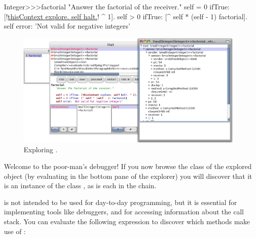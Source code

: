 \documentclass[a4paper,10pt,twoside]{book}
\begin{document}

\begin{code}{}
Integer>>>factorial
        "Answer the factorial of the receiver."
        self = 0 ifTrue: [!\underline{thisContext explore. self halt.}! ^ 1].
        self > 0 ifTrue: [^ self * (self - 1) factorial].
        self error: 'Not valid for negative integers'
\end{code}


\begin{figure}[ht]\centering
        \includegraphics[width=\linewidth]{exploringThisContext}
        \caption{Exploring .}
\end{figure}

Welcome to the poor-man's debugger!
If you now browse the class of the explored object (\ie by evaluating  in the bottom pane of the explorer) you will discover that it is an instance of the class , as is each  in the chain.

 is not intended to be used for day-to-day programming, but it is essential for implementing tools like debuggers, and for accessing information about the call stack.
You can evaluate the following expression to discover which methods make use of :
\end{document}
